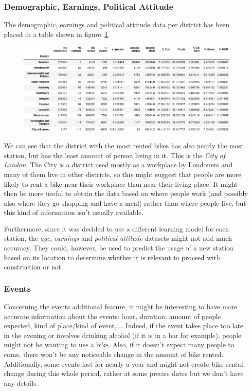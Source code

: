 \subsubsection{Demographic, Earnings, Political Attitude}
The demographic, earnings and political attitude data per district has been
placed in a table shown in figure~\ref{fig:addition_features}.
\begin{figure}[H]
\centering
\includegraphics[width=\textwidth]{img/additional_features}\label{fig:addition_features}
\label{fig:addition_features}
\end{figure}

We can see that the district with the most rented bikes has also nearly the most
station, but has the least amount of person living in it. This is the \emph{City
of London}.
The City is a district used mostly as a workplace by Londoners and many of them
live in other districts, so this might suggest that people are more likely to
rent a bike near their workplace than near their living place.
It might then be more useful to obtain the data based on where people work
(and possibly also where they go shopping and have a meal) rather than where
people live, but this kind of information isn't usually available.

Furthermore, since it was decided to use a different learning model for each station,
the \emph{age}, \emph{earnings} and \emph{political attitude} datasets might not add
much accuracy. They could, however, be used to predict the usage of a new station
based on its location to determine whether it is relevant to proceed with construction
or not.

\subsubsection{Events}

Concerning the events additional feature, it might be interesting to have more
accurate information about the events: hour, duration, amount of people expected,
kind of place/kind of event, \ldots{}
Indeed, if the event takes place too late in the evening or involves drinking
alcohol (if it is in a bar for example), people might not be wanting to use a bike.
Also, if it doesn't expect many people to come, there won't be any noticeable change
in the amount of bike rented.
Additionally, some events last for nearly a year and might not create bike rental
change during this whole period, rather at some precise dates but we don't have
any details.
